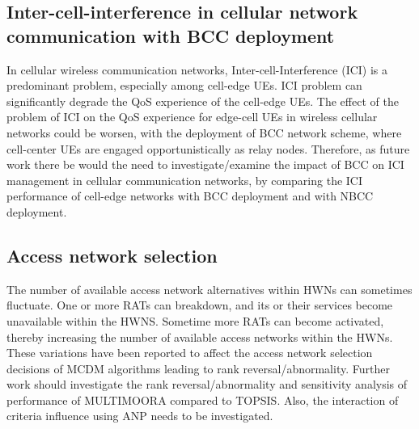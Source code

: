  \subsection{ Inter-cell-interference in cellular  network communication with BCC deployment}
 
 In cellular wireless communication  networks, Inter-cell-Interference (ICI) is a predominant problem, especially among cell-edge UEs.  ICI problem can significantly degrade the QoS experience of the cell-edge UEs. The effect of the problem of ICI on the QoS experience for edge-cell UEs  in wireless cellular networks could  be worsen, with the deployment of 
  BCC network scheme, where  
 cell-center UEs  are engaged  opportunistically as relay nodes. Therefore, as future work  there be would  the need to investigate/examine the impact of BCC on ICI management in cellular communication networks, by comparing  the ICI performance of  cell-edge networks with BCC deployment and with NBCC deployment.
 
 
 
 
 
 \subsection{Access network selection}\label{subsec:Networkaccessselection}
The number of available access network alternatives within  HWNs can sometimes  fluctuate. One or more RATs can breakdown, and  its or their services become unavailable within the HWNS. Sometime more RATs can become activated, thereby increasing the number of available access networks within the HWNs. These variations have  been reported to affect the access network selection decisions of  MCDM  algorithms leading to   rank reversal/abnormality.  Further work should investigate  the rank reversal/abnormality and  sensitivity analysis  of performance of  MULTIMOORA compared to  TOPSIS.  Also, the interaction of criteria influence using ANP needs to be  investigated.
 
  

